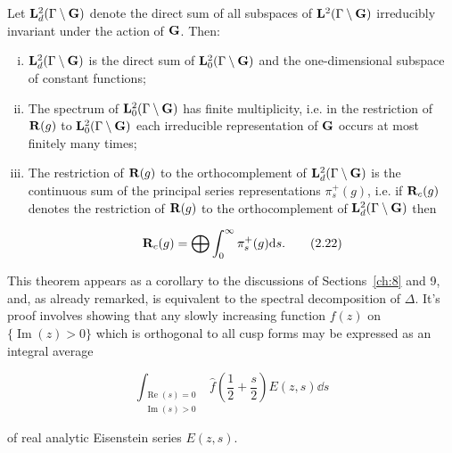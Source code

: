 \begin{theorem}\label{thm:2.6}

Let $\mathbf{L}_d^2(\Gamma \setminus \mathbf{G})$ denote the direct sum of all subspaces of $\mathbf{L}^2(\Gamma \setminus \mathbf{G})$ irreducibly invariant under the action of $\mathbf{G}$. Then:

\begin{enumerate}[(i)]

\item $\mathbf{L}_d^2(\Gamma \setminus \mathbf{G})$ is the direct sum of $\mathbf{L}_0^2(\Gamma \setminus \mathbf{G})$ and the one-dimensional subspace of constant functions;

\item The spectrum of $\mathbf{L}_0^2(\Gamma \setminus \mathbf{G})$ has finite multiplicity, i.e. in the restriction of $\mathbf{R}(g)$ to $\mathbf{L}_0^2(\Gamma \setminus \mathbf{G})$ each irreducible representation of $\mathbf{G}$ occurs at most finitely many times;

\item The restriction of $\mathbf{R}(g)$ to the orthocomplement of $\mathbf{L}_d^2(\Gamma \setminus \mathbf{G})$ is the continuous sum of the principal series representations $\pi_s^{+}(g)$, i.e. if $\mathbf{R}_c(g)$ denotes the restriction of $\mathbf{R}(g)$ to the orthocomplement of $\mathbf{L}_d^2(\Gamma \setminus \mathbf{G})$ then

\begin{equation}\label{eq:2.22}
\mathbf{R}_c(g) = \bigoplus \int_0^{\infty} \pi_s^{+}(g) \mathrm{d} s.\tag{2.22}
\end{equation}

\end{enumerate}

\end{theorem}

This theorem appears as a corollary to the discussions of Sections~\ref{ch:8} and 9, and, as already remarked, is equivalent to the spectral decomposition of $\Delta$. It's proof involves showing that any slowly increasing function $f(z)$ on $\{\operatorname{Im}(z) > 0\}$ which is orthogonal to all cusp forms may be expressed as an integral average

\[
\int_{\substack{\operatorname{Re}(s) = 0 \\ \operatorname{Im}(s) > 0}} \hat{f}\left(\frac{1}{2} + \frac{s}{2}\right) E(z, s) \dd s
\]

of real analytic Eisenstein series $E(z,s)$.

